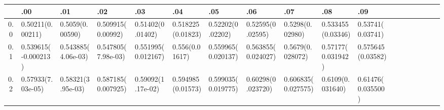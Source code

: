 \documentclass[
	article,			%
	12pt,				%
	twoside,			%
	a4paper,			%
	english,			%
	brazil,				%
	]{abntex2}
\begin{document}
        	\begin{landscape}
        	\begin{table}\footnotesize\label{tabela:pnorm_polar}
    		\begin{tabular}{c||p{18mm}|p{18mm}|p{18mm}|p{18mm}|p{18mm}|p{18mm}|p{18mm}|p{18mm}|p{18mm}|p{18mm}|p{18mm}|p{18mm}|p{18mm}|p{18mm}|p{18mm}|p{18mm}|p{18mm}}
    			~   & .00 & .01 & .02 & .03 & .04 & .05 & .06 & .07 & .08 & .09\\
    			\hline \hline
    			0.0 &0.50211\newline(0.00211)&0.5059\newline(0.00590)&0.509915\newline(0.00992)&0.51402\newline(0.01402)&0.518225\newline(0.01823)&0.52202\newline(0.02202)&0.52595\newline(0.02595)&0.5298\newline(0.02980)&0.533455\newline(0.03346)&0.53741\newline(0.03741)\\
   			    \hline
    			0.1 & 0.539615\newline(-0.000213)&0.543885\newline(4.06e-03)&0.547805\newline(7.98e-03)&0.551995\newline(0.012167)&0.556\newline(0.01617)&0.559965\newline(0.020137)&0.563855\newline(0.024027)&0.5679\newline(0.028072)&0.57177\newline(0.031942)&0.575645\newline(0.03582)\\
    			\hline
    			0.2 & 0.57933\newline(7.03e-05)&0.58321\newline(3.95e-03)&0.587185\newline(0.007925)&0.59092\newline(1.17e-02)&0.594985\newline(0.01573)&0.599035\newline(0.019775)&0.60298\newline(0.023720)&0.606835\newline(0.027575)&0.6109\newline(0.031640)&0.61476\newline(0.035500)\\

\end{tabular}
\end{table}
\end{landscape}
\end{document}
